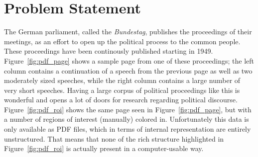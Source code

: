 \section{Problem Statement}
The German parliament, called the \emph{Bundestag}, publishes the proceedings of
their meetings, as an effort to open up the political process to the common
people. These proceedings have been continously published starting in 1949.
Figure~\ref{fig:pdf_page} shows a sample page from one of these proceedings; the
left column contains a continuation of a speech from the previous page as well
as two moderately sized speeches, while the right column contains a large number
of very short speeches. Having a large corpus of political proceedings like this
is wonderful and opens a lot of doors for research regarding political
discourse. Figure~\ref{fig:pdf_roi} shows the same page seen in
Figure~\ref{fig:pdf_page}, but with a number of regions of interest (manually)
colored in. Unfortunately this data is only available as PDF files, which in
terms of internal representation are entirely unstructured. That means that none
of the rich structure highlighted in Figure~\ref{fig:pdf_roi} is actually
present in a computer-usable way.

